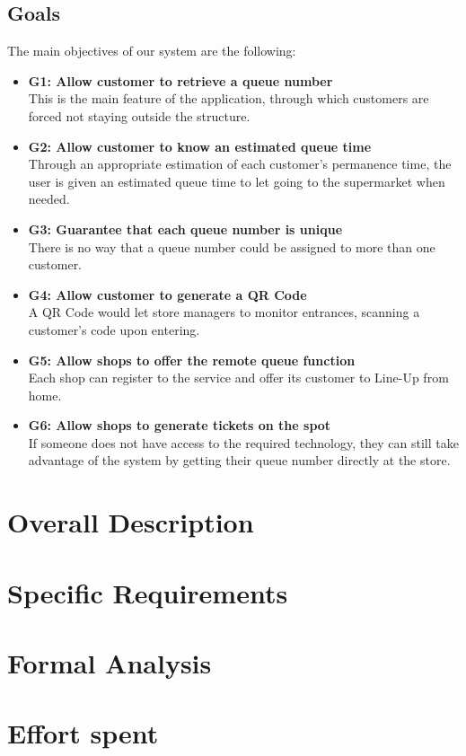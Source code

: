 \documentclass[12pt]{article}
\begin{document}
\subsection{Goals}
The main objectives of our system are the following:
\begin{itemize}
    \item {\textbf{G1: Allow customer to retrieve a queue number}\\This is the main feature of the application, through which customers are forced not staying outside the structure.}
    \item {\textbf{G2: Allow customer to know an estimated queue time}\\Through an appropriate estimation of each customer's permanence time, the user is given an estimated queue time to let going to the supermarket when needed.}
    \item {\textbf{G3: Guarantee that each queue number is unique}\\There is no way that a queue number could be assigned to more than one customer.}
    \item {\textbf{G4: Allow customer to generate a QR Code}\\A QR Code would let store managers to monitor entrances, scanning a customer's code upon entering.}
    \item {\textbf{G5: Allow shops to offer the remote queue function}\\Each shop can register to the service and offer its customer to Line-Up from home.}
    \item {\textbf{G6: Allow shops to generate tickets on the spot}\\If someone does not have access to the required technology, they can still take advantage of the system by getting their queue number directly at the store.}
\end{itemize}

\newpage
\section{Overall Description}
\newpage
\section{Specific Requirements}
\newpage
\section{Formal Analysis}
\newpage
\section{Effort spent}
\end{document}
